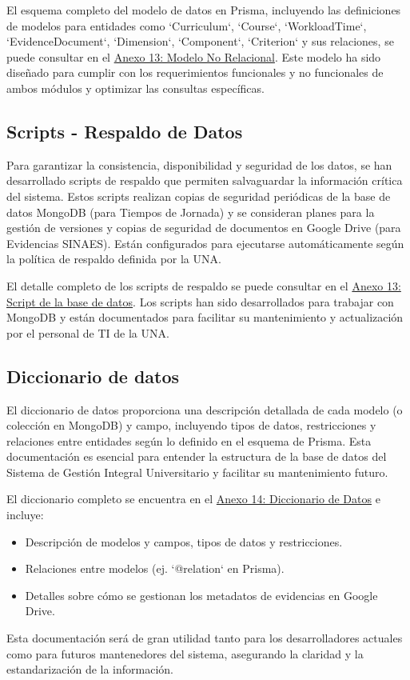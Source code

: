 El esquema completo del modelo de datos en Prisma, incluyendo las definiciones de modelos para entidades como `Curriculum`, `Course`, `WorkloadTime`, `EvidenceDocument`, `Dimension`, `Component`, `Criterion` y sus relaciones, se puede consultar en el \hyperref[anexo:modelo_relacional]{Anexo 13: Modelo No Relacional}. Este modelo ha sido diseñado para cumplir con los requerimientos funcionales y no funcionales de ambos módulos y optimizar las consultas específicas.

\subsection{Scripts - Respaldo de Datos}
Para garantizar la consistencia, disponibilidad y seguridad de los datos, se han desarrollado scripts de respaldo que permiten salvaguardar la información crítica del sistema. Estos scripts realizan copias de seguridad periódicas de la base de datos MongoDB (para Tiempos de Jornada) y se consideran planes para la gestión de versiones y copias de seguridad de documentos en Google Drive (para Evidencias SINAES). Están configurados para ejecutarse automáticamente según la política de respaldo definida por la UNA.

El detalle completo de los scripts de respaldo se puede consultar en el \hyperref[anexo:script]{Anexo 13: Script de la base de datos}. Los scripts han sido desarrollados para trabajar con MongoDB y están documentados para facilitar su mantenimiento y actualización por el personal de TI de la UNA.

\subsection{Diccionario de datos}
El diccionario de datos proporciona una descripción detallada de cada modelo (o colección en MongoDB) y campo, incluyendo tipos de datos, restricciones y relaciones entre entidades según lo definido en el esquema de Prisma. Esta documentación es esencial para entender la estructura de la base de datos del Sistema de Gestión Integral Universitario y facilitar su mantenimiento futuro.

El diccionario completo se encuentra en el \hyperref[anexo:diccionario_de_Datos]{Anexo 14: Diccionario de Datos} e incluye:
\begin{itemize}
    \item Descripción de modelos y campos, tipos de datos y restricciones.
    \item Relaciones entre modelos (ej. `@relation` en Prisma).
    \item Detalles sobre cómo se gestionan los metadatos de evidencias en Google Drive.
\end{itemize}
Esta documentación será de gran utilidad tanto para los desarrolladores actuales como para futuros mantenedores del sistema, asegurando la claridad y la estandarización de la información.